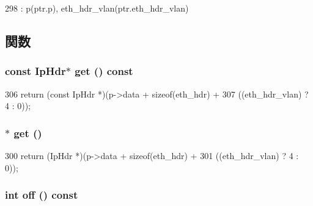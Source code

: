 \begin{DoxyCode}
298 : p(ptr.p), eth_hdr_vlan(ptr.eth_hdr_vlan) { }
\end{DoxyCode}


\subsection{関数}
\hypertarget{classNet_1_1IpPtr_a3558d2be06e557d21b960c7cacb91b76}{
\subsubsection[{get}]{\setlength{\rightskip}{0pt plus 5cm}const {\bf IpHdr}$\ast$ get () const}}
\label{classNet_1_1IpPtr_a3558d2be06e557d21b960c7cacb91b76}



\begin{DoxyCode}
306     { return (const IpHdr *)(p->data + sizeof(eth_hdr) +
307                             ((eth_hdr_vlan) ? 4 : 0)); }
\end{DoxyCode}
\hypertarget{classNet_1_1IpPtr_ad540e4acc1acafd79e71d9680bdc66f9}{
\subsubsection[{get}]{$\ast$ get ()}}
\label{classNet_1_1IpPtr_ad540e4acc1acafd79e71d9680bdc66f9}



\begin{DoxyCode}
300                  { return (IpHdr *)(p->data + sizeof(eth_hdr) +
301                                    ((eth_hdr_vlan) ? 4 : 0)); }
\end{DoxyCode}
\hypertarget{classNet_1_1IpPtr_a81fa7ab0c6e92d4496ee915a8a3705f9}{
\subsubsection[{off}]{\setlength{\rightskip}{0pt plus 5cm}int off () const}}
\label{classNet_1_1IpPtr_a81fa7ab0c6e92d4496ee915a8a3705f9}



